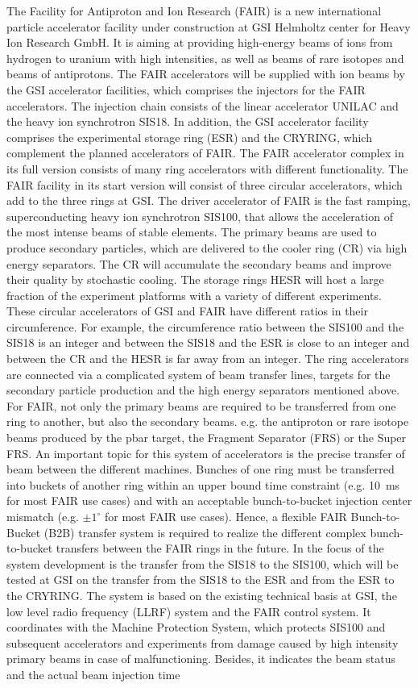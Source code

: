 The Facility for Antiproton and Ion Research (FAIR) is a new international particle accelerator facility under construction at GSI Helmholtz center for Heavy Ion Research GmbH. It is aiming at providing high-energy beams of ions from hydrogen to uranium with high intensities, as well as beams of rare isotopes and beams of antiprotons. The FAIR accelerators will be supplied with ion beams by the GSI accelerator facilities, which comprises the injectors for the FAIR accelerators. The injection chain consists of the linear accelerator UNILAC and the heavy ion synchrotron SIS18. In addition, the GSI accelerator facility comprises the experimental storage ring (ESR) and the CRYRING, which complement the planned accelerators of FAIR. The FAIR accelerator complex in its full version consists of many ring accelerators with different functionality. The FAIR facility in its start version will consist of three circular accelerators, which add to the three rings at GSI. The driver accelerator of FAIR is the fast ramping, superconducting heavy ion synchrotron SIS100, that allows the acceleration of the most intense beams of stable elements. The primary beams are used to produce secondary particles, which are delivered to the cooler ring (CR) via high energy separators. The CR will accumulate the secondary beams and improve their quality by stochastic cooling. The storage rings HESR will host a large fraction of the experiment platforms with a variety of different experiments. These circular accelerators of GSI and FAIR have different ratios in their circumference. For example, the circumference ratio between the SIS100 and the SIS18 is an integer and between the SIS18 and the ESR is close to an integer and between the CR and the HESR is far away from an integer. The ring accelerators are connected via a complicated system of beam transfer lines, targets for the secondary particle production and the high energy separators mentioned above. For FAIR, not only the primary beams are required to be transferred from one ring to another, but also the secondary beams. e.g. the antiproton or rare isotope beams produced by the pbar target, the Fragment Separator (FRS) or the Super FRS. An important topic for this system of accelerators is the precise transfer of beam between the different machines. Bunches of one ring must be transferred into buckets of another ring within an upper bound time constraint (e.g. \SI{10}{\ms} for most FAIR use cases) and with an acceptable bunch-to-bucket injection center mismatch (e.g. $\pm1^\circ$ for most FAIR use cases). Hence, a flexible FAIR Bunch-to-Bucket (B2B) transfer system is required to realize the different complex bunch-to-bucket transfers between the FAIR rings in the future. In the focus of the system development is the transfer from the SIS18 to the SIS100, which will be tested at GSI on the transfer from the SIS18 to the ESR and from the ESR to the CRYRING. The system is based on the existing technical basis at GSI, the low level radio frequency (LLRF) system and the FAIR control system. It coordinates with the Machine Protection System, which protects SIS100 and subsequent accelerators and experiments from damage caused by high intensity primary beams in case of malfunctioning. Besides, it indicates the beam status and the actual beam injection time 